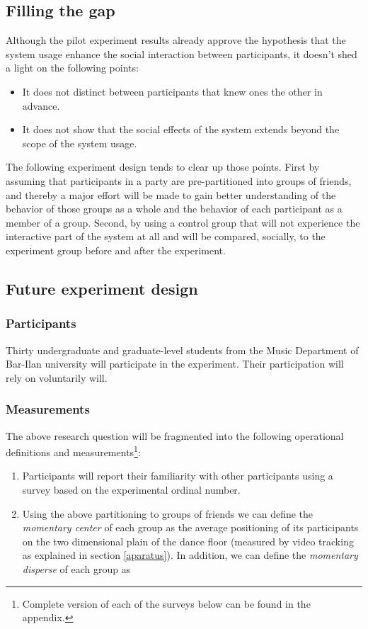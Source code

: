\documentclass[a4paper,11pt]{article}
\newcommand{\definition}[1]{\emph{#1}}
\begin{document}
{\subsection{Filling the gap}

Although the pilot experiment results already approve the hypothesis that the system usage enhance the social interaction between participants, it doesn't shed a light on the following points:

\begin{itemize}
	\item It does not distinct between participants that knew ones the other in advance.
	\item It does not show that the social effects of the system extends beyond the scope of the system usage.
\end{itemize}

The following experiment design tends to clear up those points.
First by assuming that participants in a party are pre-partitioned into groups of friends, and thereby a major effort will be made to gain better understanding of the behavior of those groups as a whole and the behavior of each participant as a member of a group.
Second, by using a control group that will not experience the interactive part of the system at all and will be compared, socially, to the experiment group before and after the experiment.

\subsection{Future experiment design}\label{methods:evaluation}

\subsubsection{Participants}

Thirty undergraduate and graduate-level students from the Music Department of Bar-Ilan university will participate in the experiment.
Their participation will rely on voluntarily will.

\subsubsection{Measurements}

The above research question will be fragmented into the following operational definitions and measurements\footnote{Complete version of each of the surveys below can be found in the appendix.}:
\begin{enumerate}
	\item \label{measure:partitioning} Participants will report their familiarity with other participants using a survey based on the experimental ordinal number.
	\item \label{measure:disperse} Using the above partitioning to groups of friends we can define the \definition{momentary center} of each group as the average positioning of its participants on the two dimensional plain of the dance floor (measured by video tracking as explained in section \ref{aparatus}).
	In addition, we can define the \definition{momentary disperse} of each group as


\end{enumerate}}
\end{document}
